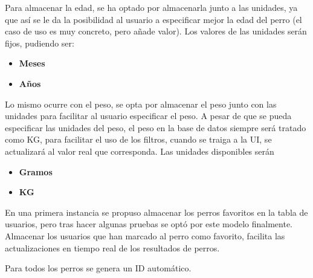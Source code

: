 \documentclass[a4paper, 12pt]{article}
\begin{document}
Para almacenar la edad, se ha optado por almacenarla junto a las unidades, ya que así se le da la posibilidad al usuario a especificar mejor la edad del perro (el caso de uso es muy concreto, pero añade valor). Los valores de las unidades serán fijos, pudiendo ser:

\begin{itemize}[noitemsep]
	\item \textbf{Meses}
	\item \textbf{Años}
\end{itemize}

Lo mismo ocurre con el peso, se opta por almacenar el peso junto con las unidades para facilitar al usuario especificar el peso. A pesar de que se pueda especificar las unidades del peso, el peso en la base de datos siempre será tratado como KG, para facilitar el uso de los filtros, cuando se traiga a la UI, se actualizará al valor real que corresponda. Las unidades disponibles serán
\begin{itemize}[noitemsep]
	\item \textbf{Gramos}
	\item \textbf{KG}
\end{itemize}

En una primera instancia se propuso almacenar los perros favoritos en la tabla de usuarios, pero tras hacer algunas pruebas se optó por este modelo finalmente. Almacenar los usuarios que han marcado al perro como favorito, facilita las actualizaciones en tiempo real de los resultados de perros.

Para todos los perros se genera un ID automático.
\end{document}

